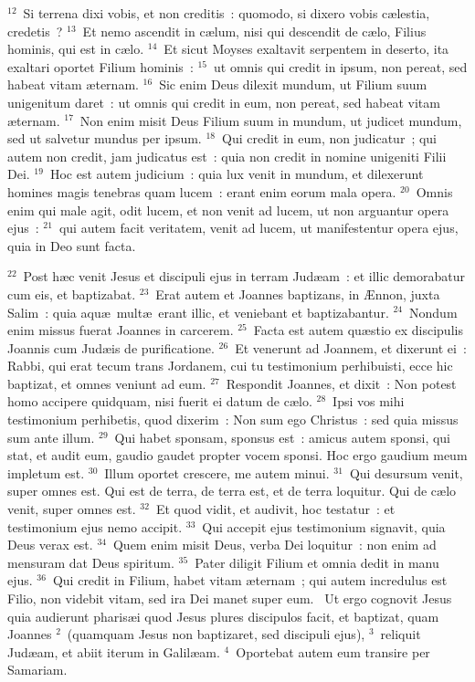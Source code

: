 ${}^{12}$~Si terrena dixi vobis, et non creditis~: quomodo, si dixero vobis c\ae lestia, credetis~?
${}^{13}$~Et nemo ascendit in c\ae lum, nisi qui descendit de c\ae lo, Filius hominis, qui est in c\ae lo.
${}^{14}$~Et sicut Moyses exaltavit serpentem in deserto, ita exaltari oportet Filium hominis~:
${}^{15}$~ut omnis qui credit in ipsum, non pereat, sed habeat vitam \ae ternam.
${}^{16}$~Sic enim Deus dilexit mundum, ut Filium suum unigenitum daret~: ut omnis qui credit in eum, non pereat, sed habeat vitam \ae ternam.
${}^{17}$~Non enim misit Deus Filium suum in mundum, ut judicet mundum, sed ut salvetur mundus per ipsum.
${}^{18}$~Qui credit in eum, non judicatur~; qui autem non credit, jam judicatus est~: quia non credit in nomine unigeniti Filii Dei.
${}^{19}$~Hoc est autem judicium~: quia lux venit in mundum, et dilexerunt homines magis tenebras quam lucem~: erant enim eorum mala opera.
${}^{20}$~Omnis enim qui male agit, odit lucem, et non venit ad lucem, ut non arguantur opera ejus~:
${}^{21}$~qui autem facit veritatem, venit ad lucem, ut manifestentur opera ejus, quia in Deo sunt facta.


${}^{22}$~Post h\ae c venit Jesus et discipuli ejus in terram Jud\ae am~: et illic demorabatur cum eis, et baptizabat.
${}^{23}$~Erat autem et Joannes baptizans, in \AE nnon, juxta Salim~: quia aqu\ae\ mult\ae\ erant illic, et veniebant et baptizabantur.
${}^{24}$~Nondum enim missus fuerat Joannes in carcerem.
${}^{25}$~Facta est autem qu\ae stio ex discipulis Joannis cum Jud\ae is de purificatione.
${}^{26}$~Et venerunt ad Joannem, et dixerunt ei~: Rabbi, qui erat tecum trans Jordanem, cui tu testimonium perhibuisti, ecce hic baptizat, et omnes veniunt ad eum.
${}^{27}$~Respondit Joannes, et dixit~: Non potest homo accipere quidquam, nisi fuerit ei datum de c\ae lo.
${}^{28}$~Ipsi vos mihi testimonium perhibetis, quod dixerim~: Non sum ego Christus~: sed quia missus sum ante illum.
${}^{29}$~Qui habet sponsam, sponsus est~: amicus autem sponsi, qui stat, et audit eum, gaudio gaudet propter vocem sponsi. Hoc ergo gaudium meum impletum est.
${}^{30}$~Illum oportet crescere, me autem minui.
${}^{31}$~Qui desursum venit, super omnes est. Qui est de terra, de terra est, et de terra loquitur. Qui de c\ae lo venit, super omnes est.
${}^{32}$~Et quod vidit, et audivit, hoc testatur~: et testimonium ejus nemo accipit.
${}^{33}$~Qui accepit ejus testimonium signavit, quia Deus verax est.
${}^{34}$~Quem enim misit Deus, verba Dei loquitur~: non enim ad mensuram dat Deus spiritum.
${}^{35}$~Pater diligit Filium et omnia dedit in manu ejus.
${}^{36}$~Qui credit in Filium, habet vitam \ae ternam~; qui autem incredulus est Filio, non videbit vitam, sed ira Dei manet super eum.
~Ut ergo cognovit Jesus quia audierunt pharis\ae i quod Jesus plures discipulos facit, et baptizat, quam Joannes
${}^{2}$~(quamquam Jesus non baptizaret, sed discipuli ejus),
${}^{3}$~reliquit Jud\ae am, et abiit iterum in Galil\ae am.
${}^{4}$~Oportebat autem eum transire per Samariam.


